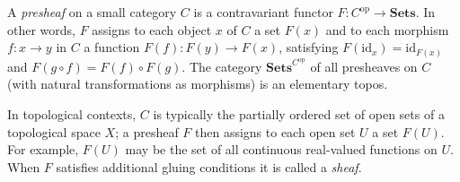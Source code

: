 A \emph{presheaf} on a small category $C$ is a contravariant functor $F \colon C^{\mathrm{op}} \to \mathbf{Sets}$. In other words, $F$ assigns to each object $x$ of $C$ a set $F(x)$ and to each morphism $f \colon x \to y$ in $C$ a function $F(f) \colon F(y) \to F(x)$, satisfying $F(\mathrm{id}_x) = \mathrm{id}_{F(x)}$ and $F(g \circ f) = F(f) \circ F(g)$. The category $\mathbf{Sets}^{C^{\mathrm{op}}}$ of all presheaves on $C$ (with natural transformations as morphisms) is an elementary topos.

In topological contexts, $C$ is typically the partially ordered set of open sets of a topological space $X$; a presheaf $F$ then assigns to each open set $U$ a set $F(U)$. For example, $F(U)$ may be the set of all continuous real-valued functions on $U$. When $F$ satisfies additional gluing conditions it is called a \emph{sheaf}.
